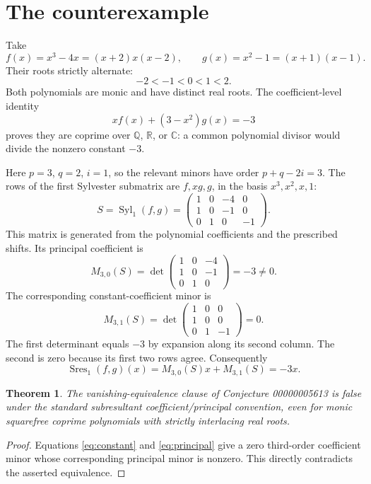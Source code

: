 \documentclass[11pt,letterpaper]{article}
\newtheorem{theorem}{Theorem}
\newcommand{\Q}{\mathbb Q}
\newcommand{\R}{\mathbb R}
\newcommand{\Syl}{\operatorname{Syl}}
\newcommand{\Sres}{\operatorname{Sres}}
\begin{document}
\newpage
\section{The counterexample}
Take
\[
 f(x)=x^3-4x=(x+2)x(x-2),\qquad
 g(x)=x^2-1=(x+1)(x-1).
\]
Their roots strictly alternate:
\[
 -2<-1<0<1<2.
\]
Both polynomials are monic and have distinct real roots. The
coefficient-level identity
\begin{equation}\label{eq:bezout}
 x f(x)+(3-x^2)g(x)=-3
\end{equation}
proves they are coprime over $\Q$, $\R$, or $\mathbb C$: a common
polynomial divisor would divide the nonzero constant $-3$.

Here $p=3$, $q=2$, $i=1$, so the relevant minors have order
$p+q-2i=3$. The rows of the first Sylvester submatrix are
$f,xg,g$, in the basis $x^3,x^2,x,1$:
\[
 S=\Syl_1(f,g)=
 \begin{pmatrix}
 1&0&-4&0\\
 1&0&-1&0\\
 0&1&0&-1
 \end{pmatrix}.
\]
This matrix is generated from the polynomial coefficients and the
prescribed shifts. Its principal coefficient is
\begin{equation}\label{eq:principal}
 M_{3,0}(S)=
 \det\begin{pmatrix}
 1&0&-4\\1&0&-1\\0&1&0
 \end{pmatrix}=-3\ne0.
\end{equation}
The corresponding constant-coefficient minor is
\begin{equation}\label{eq:constant}
 M_{3,1}(S)=
 \det\begin{pmatrix}
 1&0&0\\1&0&0\\0&1&-1
 \end{pmatrix}=0.
\end{equation}
The first determinant equals $-3$ by expansion along its second
column. The second is zero because its first two rows agree.
Consequently
\[
 \Sres_1(f,g)(x)=M_{3,0}(S)x+M_{3,1}(S)=-3x.
\]

\begin{theorem}
The vanishing-equivalence clause of Conjecture 00000005613 is false
under the standard subresultant coefficient/principal convention,
even for monic squarefree coprime polynomials with strictly interlacing
real roots.
\end{theorem}
\begin{proof}
Equations \eqref{eq:constant} and \eqref{eq:principal} give a zero
third-order coefficient minor whose corresponding principal minor is
nonzero. This directly contradicts the asserted equivalence.
\end{proof}
\end{document}
